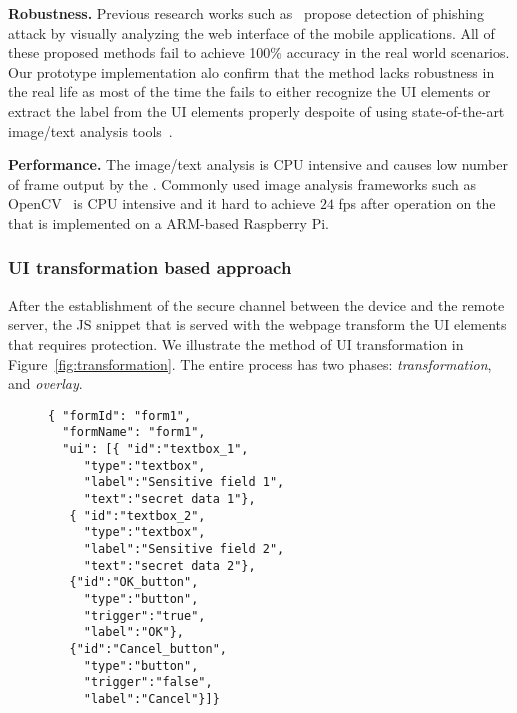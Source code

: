 \begin{mylist}
  \item \textbf{Robustness.} Previous research works such as~\cite{lukaSpoof,Chen:2010:DVS:1754393.1754394} propose detection of phishing attack by visually analyzing the web interface of the mobile applications. All of these proposed methods fail to achieve 100\% accuracy in the real world scenarios. Our prototype implementation alo confirm that the method lacks robustness in the real life as most of the time the \device fails to either recognize the UI elements or extract the label from the UI elements properly despoite of using state-of-the-art image/text analysis tools~\cite{opencv}.
  \item \textbf{Performance.} The image/text analysis is CPU intensive and causes low number of frame output by the \device. Commonly used image analysis frameworks such as OpenCV~\cite{opencv} is CPU intensive and it hard to achieve $24$ fps after operation on the \device that is implemented on a ARM-based Raspberry Pi.
\end{mylist}


\subsubsection{UI transformation based approach} After the establishment of the secure channel between the device and the remote server, the \name JS snippet that is served with the webpage transform the UI elements that requires protection. We illustrate the method of UI transformation in Figure~\ref{fig:transformation}. The entire process has two phases: \emph{transformation}, and \emph{overlay}.


\begin{figure}[t]
\begin{lstlisting}[mathescape=true]
{ "formId": "form1",
  "formName": "form1",
  "ui": [{ "id":"textbox_1",
     "type":"textbox",
     "label":"Sensitive field 1",
     "text":"secret data 1"},
   { "id":"textbox_2",
     "type":"textbox",
     "label":"Sensitive field 2",
     "text":"secret data 2"},
   {"id":"OK_button",
     "type":"button",
     "trigger":"true",
     "label":"OK"},    
   {"id":"Cancel_button",
     "type":"button",
     "trigger":"false",
     "label":"Cancel"}]}
\end{lstlisting}
\end{figure}

